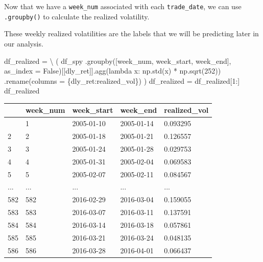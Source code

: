 \documentclass[
  letterpaper,
  DIV=11,
  numbers=noendperiod]{scrreprt}
\newenvironment{Shaded}{\begin{snugshade}}{\end{snugshade}}
\newcommand{\DecValTok}[1]{\textcolor[rgb]{0.68,0.00,0.00}{#1}}
\newcommand{\KeywordTok}[1]{\textcolor[rgb]{0.00,0.23,0.31}{#1}}
\newcommand{\NormalTok}[1]{\textcolor[rgb]{0.00,0.23,0.31}{#1}}
\newcommand{\OperatorTok}[1]{\textcolor[rgb]{0.37,0.37,0.37}{#1}}
\newcommand{\StringTok}[1]{\textcolor[rgb]{0.13,0.47,0.30}{#1}}
\newcommand{\VariableTok}[1]{\textcolor[rgb]{0.07,0.07,0.07}{#1}}
\begin{document}
Now that we have a \texttt{week\_num} associated with each
\texttt{trade\_date}, we can use \texttt{.groupby()} to calculate the
realized volatility.

These weekly realized volatilities are the labels that we will be
predicting later in our analysis.

\begin{Shaded}
\begin{Highlighting}[]
\NormalTok{df\_realized }\OperatorTok{=} \OperatorTok{\textbackslash{}}
\NormalTok{    (}
\NormalTok{    df\_spy}
\NormalTok{        .groupby([}\StringTok{\textquotesingle{}week\_num\textquotesingle{}}\NormalTok{, }\StringTok{\textquotesingle{}week\_start\textquotesingle{}}\NormalTok{, }\StringTok{\textquotesingle{}week\_end\textquotesingle{}}\NormalTok{], as\_index }\OperatorTok{=} \VariableTok{False}\NormalTok{)[[}\StringTok{\textquotesingle{}dly\_ret\textquotesingle{}}\NormalTok{]].agg(}\KeywordTok{lambda}\NormalTok{ x: np.std(x) }\OperatorTok{*}\NormalTok{ np.sqrt(}\DecValTok{252}\NormalTok{))}
\NormalTok{        .rename(columns }\OperatorTok{=}\NormalTok{ \{}\StringTok{\textquotesingle{}dly\_ret\textquotesingle{}}\NormalTok{:}\StringTok{\textquotesingle{}realized\_vol\textquotesingle{}}\NormalTok{\})}
\NormalTok{    )}
\NormalTok{df\_realized }\OperatorTok{=}\NormalTok{ df\_realized[}\DecValTok{1}\NormalTok{:]}
\NormalTok{df\_realized}
\end{Highlighting}
\end{Shaded}

\begin{longtable}[]{@{}lllll@{}}
\toprule\noalign{}
& week\_num & week\_start & week\_end & realized\_vol \\
\midrule\noalign{}
\endhead
\bottomrule\noalign{}
\endlastfoot
1 & 1 & 2005-01-10 & 2005-01-14 & 0.093295 \\
2 & 2 & 2005-01-18 & 2005-01-21 & 0.126557 \\
3 & 3 & 2005-01-24 & 2005-01-28 & 0.029753 \\
4 & 4 & 2005-01-31 & 2005-02-04 & 0.069583 \\
5 & 5 & 2005-02-07 & 2005-02-11 & 0.084567 \\
... & ... & ... & ... & ... \\
582 & 582 & 2016-02-29 & 2016-03-04 & 0.159055 \\
583 & 583 & 2016-03-07 & 2016-03-11 & 0.137591 \\
584 & 584 & 2016-03-14 & 2016-03-18 & 0.057861 \\
585 & 585 & 2016-03-21 & 2016-03-24 & 0.048135 \\
586 & 586 & 2016-03-28 & 2016-04-01 & 0.066437 \\
\end{longtable}
\end{document}
